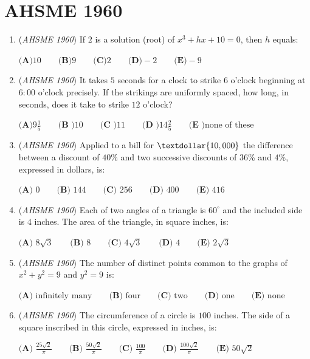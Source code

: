 \section{AHSME 1960}
        \begin{enumerate}
        	\item (\textit{AHSME 1960}) If $2$ is a solution (root) of $x^3+hx+10=0$, then $h$ equals:


 $\textbf{(A)}10\qquad \textbf{(B)}9 \qquad \textbf{(C)}2\qquad \textbf{(D)}-2\qquad \textbf{(E)}-9$


	\item (\textit{AHSME 1960}) It takes $5$ seconds for a clock to strike $6$ o'clock beginning at $6{:}00$ o'clock precisely. 
If the strikings are uniformly spaced, how long, in seconds, does it take to strike $12$ o'clock?


 $\textbf{(A)}9\frac{1}{5}\qquad \textbf{(B )}10\qquad \textbf{(C )}11\qquad \textbf{(D )}14\frac{2}{5}\qquad \textbf{(E )}\text{none of these}$


	\item (\textit{AHSME 1960}) Applied to a bill for $\textdollar{10,000}$ the difference between a discount of $40$\% and two successive discounts of $36$\% and $4$\%, 
expressed in dollars, is:


 $\textbf{(A) }0\qquad \textbf{(B) }144\qquad \textbf{(C) }256\qquad \textbf{(D) }400\qquad \textbf{(E) }416$


	\item (\textit{AHSME 1960}) Each of two angles of a triangle is $60^{\circ}$ and the included side is $4$ inches. The area of the triangle, in square inches, is:


 $\textbf{(A) }8\sqrt{3}\qquad \textbf{(B) }8\qquad \textbf{(C) }4\sqrt{3}\qquad \textbf{(D) }4\qquad \textbf{(E) }2\sqrt{3}$


	\item (\textit{AHSME 1960}) The number of distinct points common to the graphs of $x^2+y^2=9$ and $y^2=9$ is:


 $\textbf{(A) }\text{infinitely many}\qquad \textbf{(B) }\text{four}\qquad \textbf{(C) }\text{two}\qquad \textbf{(D) }\text{one}\qquad \textbf{(E) }\text{none}$


	\item (\textit{AHSME 1960}) The circumference of a circle is $100$ inches. The side of a square inscribed in this circle, expressed in inches, is:


 $\textbf{(A) }\frac{25\sqrt{2}}{\pi}\qquad \textbf{(B) }\frac{50\sqrt{2}}{\pi}\qquad \textbf{(C) }\frac{100}{\pi}\qquad \textbf{(D) }\frac{100\sqrt{2}}{\pi}\qquad \textbf{(E) }50\sqrt{2}$



\end{enumerate}
